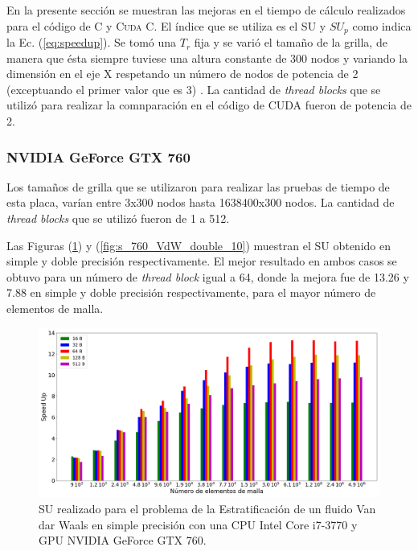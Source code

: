 En la presente sección se muestran las mejoras en el tiempo de cálculo realizados para el código de \textsc{C} y \textsc{Cuda C}. El índice que se utiliza es el SU y $SU_p$ como indica la Ec. (\ref{eq:speedup}). Se tomó una $T_r$ fija y se varió el tamaño de la grilla, de manera que ésta siempre tuviese una altura constante de 300 nodos y variando la dimensión en el eje \textsc{X} respetando un número de nodos de potencia de 2 (exceptuando el primer valor que es 3) . La cantidad de \textit{thread blocks} que se utilizó para realizar la comnparación en el código de \textsc{CUDA} fueron de potencia de 2.

\subsubsection{NVIDIA GeForce GTX 760}

Los tamaños de grilla que se utilizaron para realizar las pruebas de tiempo de esta placa, varían entre 3x300 nodos hasta 1638400x300 nodos. La cantidad de \textit{thread blocks} que se utilizó fueron de 1 a 512.

Las Figuras (\ref{fig:s_760_VdW_simple_10}) y (\ref{fig:s_760_VdW_double_10}) muestran el SU obtenido en simple y doble precisión respectivamente. El mejor resultado en ambos casos se obtuvo para un número de \textit{thread block} igual a 64, donde la mejora fue de 13.26 y 7.88 en simple y doble precisión respectivamente, para el mayor número de elementos de malla.



\begin{figure}[htbp]
	\centering
	\includegraphics[width=\textwidth]{figs_2/cap4/s_760_VdW_simple_10}
	\caption{SU realizado para el problema de la Estratificación de un fluido Van dar Waals en simple precisión con una CPU Intel Core i7-3770 y GPU NVIDIA GeForce GTX 760.} 
	\label{fig:s_760_VdW_simple_10}	
\end{figure}

